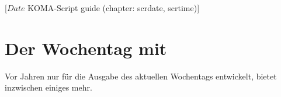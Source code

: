 %
%
%
%
%
%
%
%
% 
%
%
%
%

                 [$Date$
                  KOMA-Script guide (chapter: scrdate, scrtime)]

\chapter{Der Wochentag mit }
\BeginIndexGroup
{}

\iffalse%
Ursprünglich sollte das Paket \Package{scrdate} lediglich den Wochentag zum
aktuellen Datum liefern. Inzwischen bietet es dies und etwas mehr für jedes
beliebige Datum im Gregorianischen Kalender.%
\else%
Vor \the\numexpr{}\relax{} Jahren nur für die Ausgabe des aktuellen
Wochentags entwickelt, bietet  inzwischen einiges mehr.
\fi

